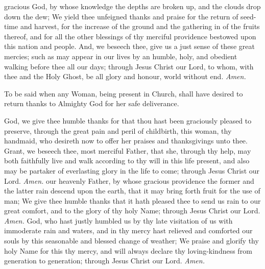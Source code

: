 \clearpage
\fancyhead[RO,LE]{}
\fancyhead[RE,LO]{}
\label{thanksgiving}
{}
 gracious God, by whose knowledge the depths are broken up, and the clouds drop down the dew; We yield thee unfeigned thanks and praise for the return of seed-time and harvest, for the increase of the ground and the gathering in of the fruits thereof, and for all the other blessings of thy merciful providence bestowed upon this nation and people. And, we beseech thee, give us a just sense of these great mercies; such as may appear in our lives by an humble, holy, and obedient walking before thee all our days; through Jesus Christ our Lord, to whom, with thee and the Holy Ghost, be all glory and honour, world without end. \textit{Amen.}
\begin{rubric}
	To be said when any Woman, being present in Church, shall have desired to return thanks to Almighty God for her safe deliverance.
\end{rubric}%
 God, we give thee humble thanks for that thou hast been graciously pleased to preserve, through the great pain and peril of childbirth, this woman, thy handmaid, who desireth now to offer her praises and thanksgivings unto thee. Grant, we beseech thee, most merciful Father, that she, through thy help, may both faithfully live and walk according to thy will in this life present, and also may be partaker of everlasting glory in the life to come; through Jesus Christ our Lord. \textit{Amen.}
 our heavenly Father, by whose gracious providence the former and the latter rain descend upon the earth, that it may bring forth fruit for the use of man; We give thee humble thanks that it hath pleased thee to send us rain to our great comfort, and to the glory of thy holy Name; through Jesus Christ our Lord. \textit{Amen.}
 God, who hast justly humbled us by thy late visitation of us with immoderate rain and waters, and in thy mercy hast relieved and comforted our souls by this seasonable and blessed change of weather; We praise and glorify thy holy Name for this thy mercy, and will always declare thy loving-kindness from generation to generation; through Jesus Christ our Lord. \textit{Amen.}
